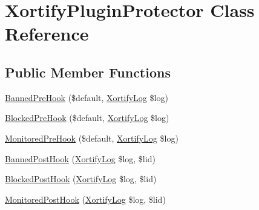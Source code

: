 \hypertarget{class_xortify_plugin_protector}{\section{Xortify\-Plugin\-Protector Class Reference}
\label{class_xortify_plugin_protector}
}
\subsection*{Public Member Functions}
\begin{DoxyCompactItemize}
\item 
\hyperlink{class_xortify_plugin_protector_aacd0a27d3740aae83c03e921f6e58783}{Banned\-Pre\-Hook} (\$default, \hyperlink{class_xortify_log}{Xortify\-Log} \$log)
\item 
\hyperlink{class_xortify_plugin_protector_a1b0001df5cf5ef18a5181774ce16b089}{Blocked\-Pre\-Hook} (\$default, \hyperlink{class_xortify_log}{Xortify\-Log} \$log)
\item 
\hyperlink{class_xortify_plugin_protector_abbd4e782a10042ec86d3bef94daad89a}{Monitored\-Pre\-Hook} (\$default, \hyperlink{class_xortify_log}{Xortify\-Log} \$log)
\item 
\hyperlink{class_xortify_plugin_protector_a6bc03033f17c2fcede4d020d1cfbcc48}{Banned\-Post\-Hook} (\hyperlink{class_xortify_log}{Xortify\-Log} \$log, \$lid)
\item 
\hyperlink{class_xortify_plugin_protector_a1cb2408e6422326482b2e8eb45d2d0c1}{Blocked\-Post\-Hook} (\hyperlink{class_xortify_log}{Xortify\-Log} \$log, \$lid)
\item 
\hyperlink{class_xortify_plugin_protector_aa4a3d909c3769e0c3c7b6488f8659a1d}{Monitored\-Post\-Hook} (\hyperlink{class_xortify_log}{Xortify\-Log} \$log, \$lid)
\end{DoxyCompactItemize}


